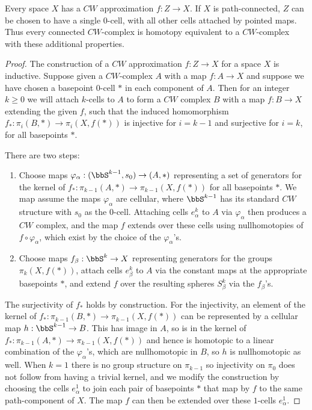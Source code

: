 \begin{prop}
    Every space $X$ has a $CW$ approximation $f:Z\to X$. If $X$ is path-connected, $Z$ can be chosen to have a single $0$-cell, with all other cells attached by pointed maps. Thus every connected $CW$-complex is homotopy equivalent to a $CW$-complex with these additional properties.
\end{prop}
\begin{proof}
    The construction of a $CW$ approximation $f:Z\to X$ for a space $X$ is inductive. Suppose given a $CW$-complex $A$ with a map $f:A\to X$ and suppose we have chosen a basepoint $0$-cell $*$ in each component of $A$. Then for an integer $k\geq 0$ we will attach $k$-cells to $A$ to form a $CW$ complex $B$ with a map $f:B\to X$ extending the given $f$, such that the induced homomorphism $f_\ast:\pi_i(B,*)\to \pi_i(X,f(*))$ is injective for $i=k-1$ and surjective for $i=k$, for all basepoints $*$.

    There are two steps:
    \begin{enumerate}[label=(\arabic*)]
        \item Choose maps $\varphi_\alpha:(\bbS^{k-1},s_0)\to (A,*)$ representing a set of generators for the kernel of $f_\ast:\pi_{k-1}(A,*)\to \pi_{k-1}(X,f(*))$ for all basepoints $*$. We map assume the maps $\varphi_\alpha$ are cellular, where $\bbS^{k-1}$ has its standard $CW$ structure with $s_0$ as the $0$-cell. Attaching cells $e_\alpha^k$ to $A$ via $\varphi_\alpha$ then produces a $CW$ complex, and the map $f$ extends over these cells using nullhomotopies of $f\circ \varphi_\alpha$, which exist by the choice of the $\varphi_\alpha$'s.
        \item Choose maps $f_\beta:\bbS^k\to X$ representing generators for the groups $\pi_k(X,f(*))$, attach cells $e_\beta^k$ to $A$ via the constant maps at the appropriate basepoints $*$, and extend $f$ over the resulting spheres $S_\beta^k$ via the $f_\beta$'s.
    \end{enumerate}

    The surjectivity of $f_\ast$ holds by construction. For the injectivity, an element of the kernel of $f_\ast:\pi_{k-1}(B,*)\to \pi_{k-1}(X,f(*))$ can be represented by a cellular map $h:\bbS^{k-1}\to B$. This has image in $A$, so is in the kernel of $f_\ast:\pi_{k-1}(A,*)\to \pi_{k-1}(X,f(*))$ and hence is homotopic to a linear combination of the $\varphi_\alpha$'s, which are nullhomotopic in $B$, so $h$ is nullhomotopic as well. When $k=1$ there is no group structure on $\pi_{k-1}$ so injectivity on $\pi_0$ does not follow from having a trivial kernel, and we modify the construction by choosing the cells $e_\alpha^1$ to join each pair of basepoints $*$ that map by $f$ to the same path-component of $X$. The map $f$ can then be extended over these $1$-cells $e_\alpha^1$.


\end{proof}
